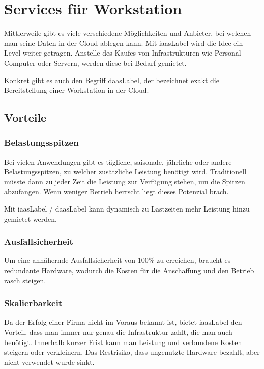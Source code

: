 \section{Services für Workstation}
Mittlerweile gibt es viele verschiedene Möglichkeiten und Anbieter, bei welchen man seine Daten in der Cloud ablegen kann. Mit \Gls{iaasLabel} wird die Idee ein Level weiter getragen. 
Anstelle des Kaufes von Infrastrukturen wie Personal Computer oder Servern, werden diese bei Bedarf gemietet.

Konkret gibt es auch den Begriff \Gls{daasLabel}, der bezeichnet exakt die Bereitstellung einer Workstation in der Cloud.

\subsection{Vorteile}
\label{sec:Vorteile}
\subsubsection{Belastungsspitzen}
Bei vielen Anwendungen gibt es tägliche, saisonale, jährliche oder andere Belastungsspitzen, zu welcher zusätzliche Leistung benötigt wird. 
Traditionell müsste dann zu jeder Zeit die Leistung zur Verfügung stehen, um die Spitzen abzufangen. Wenn weniger Betrieb herrscht liegt dieses Potenzial brach.

Mit \Gls{iaasLabel} / \Gls{daasLabel} kann dynamisch zu Lastzeiten mehr Leistung hinzu gemietet werden.



\subsubsection{Ausfallsicherheit}
Um eine annähernde Ausfallsicherheit von 100\% zu erreichen, braucht es redundante Hardware, wodurch die Kosten für die Anschaffung und den Betrieb rasch steigen.

\subsubsection{Skalierbarkeit}
Da der Erfolg einer Firma nicht im Voraus bekannt ist, bietet \Gls{iaasLabel} den Vorteil, dass man immer nur genau die Infrastruktur zahlt, die man auch benötigt.
Innerhalb kurzer Frist kann man Leistung und verbundene Kosten steigern oder verkleinern.
Das Restrisiko, dass ungenutzte Hardware bezahlt, aber nicht verwendet wurde sinkt.

